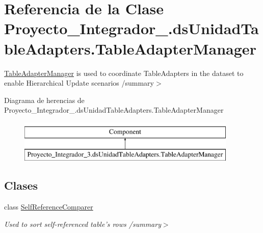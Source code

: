 \hypertarget{class_proyecto___integrador__3_1_1ds_unidad_table_adapters_1_1_table_adapter_manager}{\section{Referencia de la Clase Proyecto\-\_\-\-Integrador\-\_.\-ds\-Unidad\-Table\-Adapters.\-Table\-Adapter\-Manager}
\label{class_proyecto___integrador__3_1_1ds_unidad_table_adapters_1_1_table_adapter_manager}
}


\hyperlink{class_proyecto___integrador__3_1_1ds_unidad_table_adapters_1_1_table_adapter_manager}{Table\-Adapter\-Manager} is used to coordinate Table\-Adapters in the dataset to enable Hierarchical Update scenarios /summary$>$  


Diagrama de herencias de Proyecto\-\_\-\-Integrador\-\_.\-ds\-Unidad\-Table\-Adapters.\-Table\-Adapter\-Manager\begin{figure}[H]
\begin{center}
\leavevmode
\includegraphics[height=2.000000cm]{class_proyecto___integrador__3_1_1ds_unidad_table_adapters_1_1_table_adapter_manager}
\end{center}
\end{figure}
\subsection*{Clases}
\begin{DoxyCompactItemize}
\item 
class \hyperlink{class_proyecto___integrador__3_1_1ds_unidad_table_adapters_1_1_table_adapter_manager_1_1_self_reference_comparer}{Self\-Reference\-Comparer}
\begin{DoxyCompactList}\small\item\em Used to sort self-\/referenced table's rows /summary$>$ \end{DoxyCompactList}\end{DoxyCompactItemize}
